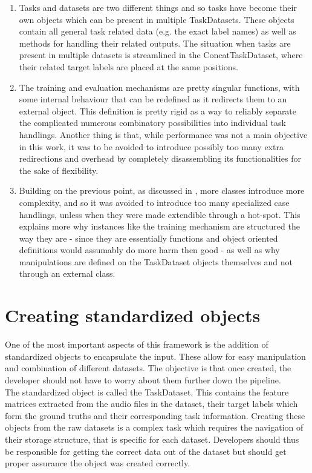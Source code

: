 \begin{enumerate}
	\item Tasks and datasets are two different things and so tasks have become their own objects which can be present in multiple TaskDatasets. These objects contain all general task related data (e.g. the exact label names) as well as methods for handling their related outputs. The situation when tasks are present in multiple datasets is streamlined in the ConcatTaskDataset, where their related target labels are placed at the same positions.
	\item The training and evaluation mechanisms are pretty singular functions, with some internal behaviour that can be redefined as it redirects them to an external object. This definition is pretty rigid as a way to reliably separate the complicated numerous combinatory possibilities into individual task handlings. Another thing is that, while performance was not a main objective in this work, it was to be avoided to introduce possibly too many extra redirections and overhead by completely disassembling its functionalities for the sake of flexibility. 
	\item Building on the previous point, as discussed in \cite{roberts1996evolving}, more classes introduce more complexity, and so it was avoided to introduce too many specialized case handlings, unless when they were made extendible through a hot-spot. This explains more why instances like the training mechanism are structured the way they are - since they are essentially functions and object oriented definitions would assumably do more harm then good - as well as why manipulations are defined on the TaskDataset objects themselves and not through an external class.
\end{enumerate}

\section{Creating standardized objects} \label{Design:StandardizedObjects}

One of the most important aspects of this framework is the addition of standardized objects to encapsulate the input. These allow for easy manipulation and combination of different datasets. The objective is that once created, the developer should not have to worry about them further down the pipeline. \\


The standardized object is called the TaskDataset. This contains the feature matrices extracted from the audio files in the dataset, their target labels which form the ground truths and their corresponding task information. Creating these objects from the raw datasets is a complex task which requires the navigation of their storage structure, that is specific for each dataset. Developers should thus be responsible for getting the correct data out of the dataset but should get proper assurance the object was created correctly. \\

